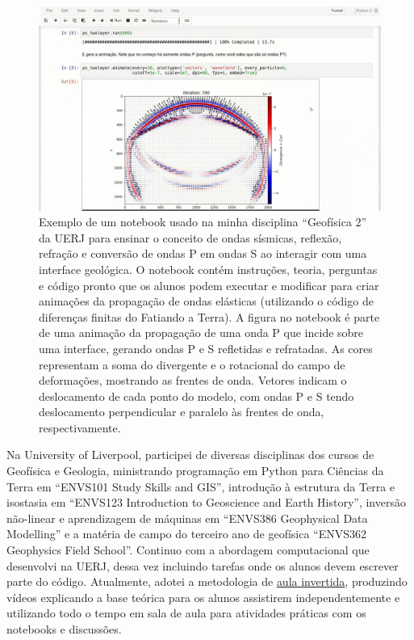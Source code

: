 \documentclass[10pt,a4paper,oneside]{book}
\begin{document}
\begin{figure}[t]
  \begin{center}
    \includegraphics[width=\textwidth]{images/seismic-waves-demo.jpg}
  \end{center}
  \caption{
    Exemplo de um notebook usado na minha disciplina ``Geofísica 2'' da UERJ
    para ensinar o conceito de ondas sísmicas, reflexão, refração e conversão
    de ondas P em ondas S ao interagir com uma interface geológica. O notebook
    contém instruções, teoria, perguntas e código pronto que os alunos
    podem executar e modificar para criar animações da propagação de ondas
    elásticas (utilizando o código de diferenças finitas do Fatiando a Terra).
    A figura no notebook é parte de uma animação da propagação de uma onda P
    que incide sobre uma interface, gerando ondas P e S refletidas e
    refratadas.
    As cores representam a soma do divergente e o rotacional do campo de
    deformações, mostrando as frentes de onda.
    Vetores indicam o deslocamento de cada ponto do modelo, com ondas P e S
    tendo deslocamento perpendicular e paralelo às frentes de onda,
    respectivamente.
  }
  \label{fig_notebooksismica}
\end{figure}

Na University of Liverpool, participei de diversas disciplinas dos cursos de
Geofísica e Geologia, ministrando
programação em Python para Ciências da Terra em ``ENVS101
Study Skills and GIS'',
introdução à estrutura da Terra e isostasia em ``ENVS123 Introduction to
Geoscience and Earth History'',
inversão não-linear e aprendizagem de máquinas em ``ENVS386 Geophysical Data
Modelling''
e a matéria de campo do terceiro ano de geofísica
``ENVS362 Geophysics Field School''.
Continuo com a abordagem computacional que desenvolvi na UERJ, dessa vez
incluindo tarefas onde os alunos devem escrever parte do código.
Atualmente, adotei a metodologia de
\href{https://pt.wikipedia.org/wiki/Aula_invertida}{aula invertida}, produzindo
vídeos explicando a base teórica para os alunos assistirem independentemente e
utilizando todo o tempo em sala de aula para atividades práticas com os
notebooks e discussões.
\end{document}
